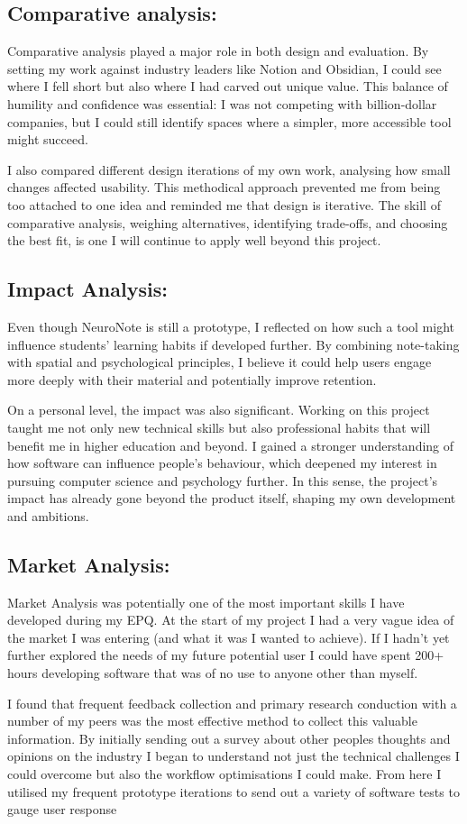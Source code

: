 \subsection{Comparative analysis:}
Comparative analysis played a major role in both design and evaluation. By setting my work against industry leaders like Notion and Obsidian, I could see where I fell short but also where I had carved out unique value. This balance of humility and confidence was essential: I was not competing with billion-dollar companies, but I could still identify spaces where a simpler, more accessible tool might succeed.

I also compared different design iterations of my own work, analysing how small changes affected usability. This methodical approach prevented me from being too attached to one idea and reminded me that design is iterative. The skill of comparative analysis, weighing alternatives, identifying trade-offs, and choosing the best fit, is one I will continue to apply well beyond this project.

\subsection{Impact Analysis:}
 Even though NeuroNote is still a prototype, I reflected on how such a tool might influence students' learning habits if developed further. By combining note-taking with spatial and psychological principles, I believe it could help users engage more deeply with their material and potentially improve retention.

On a personal level, the impact was also significant. Working on this project taught me not only new technical skills but also professional habits that will benefit me in higher education and beyond. I gained a stronger understanding of how software can influence people's behaviour, which deepened my interest in pursuing computer science and psychology further. In this sense, the project's impact has already gone beyond the product itself, shaping my own development and ambitions.


\subsection{Market Analysis:}
Market Analysis was potentially one of the most important skills I have developed during my EPQ. At the start of my project I had a very vague idea of the market I was entering (and what it was I wanted to achieve). If I hadn't yet further explored the needs of my future potential user I could have spent 200+ hours developing software that was of no use to anyone other than myself. 

I found that frequent feedback collection and primary research conduction with a number of my peers was the most effective method to collect this valuable information. By initially sending out a survey about other peoples thoughts and opinions on the industry I began to understand not just the technical challenges I could overcome but also the workflow optimisations I could make. From here I utilised my frequent prototype iterations to send out a variety of software tests to gauge user response 



